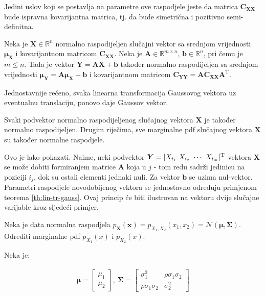 Jedini uslov koji se postavlja na parametre ove raspodjele jeste da matrica
$\bm C_{\bm X\bm X}$ bude ispravna kovarijantna matrica, tj. da bude simetrična
i pozitivno semi-definitna.

\begin{theorem}
	\label{th:lin-tr-gauss}
	Neka je $\bm X \in \mathbb{R}^n$ normalno raspodijeljen slučajni vektor sa
	srednjom vrijednosti $\bm\mu_{\bm X}$ i kovarijantnom matricom $\bm C_{\bm
	X\bm X}$. Neka je $\bm A \in \mathbb{R}^{m\times n}$, $\bm b \in
	\mathbb{R}^n$, pri čemu je $m\le n$. Tada je vektor $\bm Y = \bm A \bm X + \bm
	b$ također normalno raspodijeljen sa srednjom vrijednosti $\bm\mu_{\bm Y} =
	\bm A\bm\mu_{\bm X} + \bm b$ i kovarijantnom matricom $\bm C_{\bm Y\bm Y} =
	\bm A \bm C_{\bm X\bm X} \bm A^\mathrm T$.

\end{theorem}

Jednostavnije rečeno, svaka linearna transformacija Gaussovog vektora uz
eventualnu translaciju, ponovo daje Gaussov vektor.

\begin{corollary}
	Svaki podvektor normalno raspodijeljenog slučajnog vektora $\bm X$ je također
	normalno raspodijeljen. Drugim riječima, sve marginalne pdf slučajnog
	vektora $\bm X$ su također normalne raspodjele.
\end{corollary}

Ovo je lako pokazati. Naime, neki podvektor $\bm Y = [X_{i_1}\ X_{i_2}\ \cdots\
X_{i_m}]^\text T$ vektora $\bm X$ se može dobiti formiranjem matrice $\bm A$
koja u $j$ - tom redu sadrži jedinicu na poziciji $i_j$, dok su ostali elementi
jednaki nuli. Za vektor $\bm b$ se uzima nul-vektor.  Parametri raspodjele
novodobijenog vektora se jednostavno određuju primjenom teorema
\ref{th:lin-tr-gauss}. Ovaj princip će biti ilustrovan na vektoru dvije slučajne
varijable kroz sljedeći primjer.

\begin{exmp}
	Neka je data normalna raspodjela $p_{\bm X}(\bm x) = p_{X_1,X_2}(x_1, x_2) =
	\mathcal{N}(\bm\mu, \bm \Sigma)$. Odrediti marginalne pdf $p_{X_1}(x)$ i
	$p_{X_2}(x)$.
\end{exmp}

Neka je:

\begin{eqnarray} \label{eq:kovarijansa-2d}
	\bm\mu = \left[\begin{array}{c}
		\mu_1 \\ \mu_2
	\end{array}\right],\ 
	\bm\Sigma = \left[\begin{array}{cc}
	  \sigma_1^2 & \rho\sigma_1\sigma_2 \\  \rho\sigma_1\sigma_2 & \sigma_2^2
	\end{array}\right]
\end{eqnarray}

